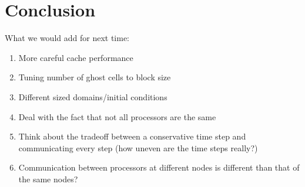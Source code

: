 \documentclass{article}
\begin{document}
\section{Conclusion}
What we would add for next time:
\begin{enumerate}
	\item More careful cache performance
	\item Tuning number of ghost cells to block size
	\item Different sized domains/initial conditions
	\item Deal with the fact that not all processors are the same
	\item Think about the tradeoff between a conservative time step and communicating every step (how uneven are the time steps really?)
	\item Communication between processors at different nodes is different than that of the same nodes?
\end{enumerate}
\end{document}
